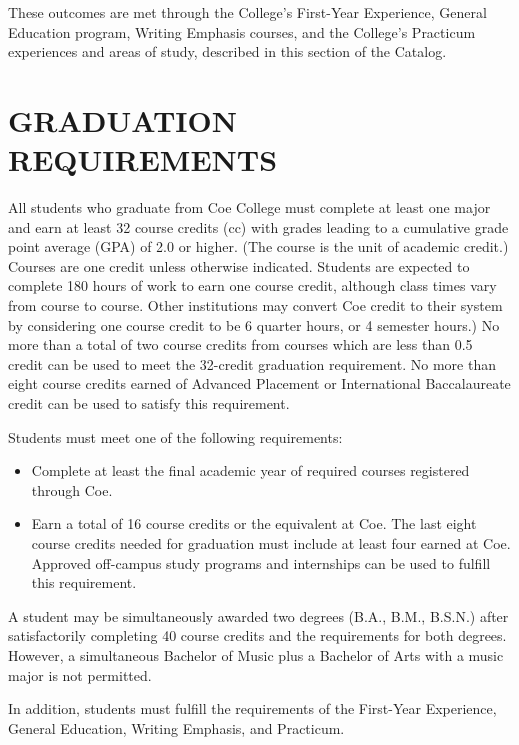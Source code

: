 \documentclass[
  letterpaper,
]{scrbook}
\providecommand{\tightlist}{%
  \setlength{\itemsep}{0pt}\setlength{\parskip}{0pt}}
\begin{document}
These outcomes are met through the College's First-Year Experience,
General Education program, Writing Emphasis courses, and the College's
Practicum experiences and areas of study, described in this section of
the Catalog.

\hypertarget{graduation-requirements}{%
\chapter{GRADUATION REQUIREMENTS}\label{graduation-requirements}}

All students who graduate from Coe College must complete at least one
major and earn at least 32 course credits (cc) with grades leading to a
cumulative grade point average (GPA) of 2.0 or higher. (The course is
the unit of academic credit.) Courses are one credit unless otherwise
indicated. Students are expected to complete 180 hours of work to earn
one course credit, although class times vary from course to course.
Other institutions may convert Coe credit to their system by considering
one course credit to be 6 quarter hours, or 4 semester hours.) No more
than a total of two course credits from courses which are less than 0.5
credit can be used to meet the 32-credit graduation requirement. No more
than eight course credits earned of Advanced Placement or International
Baccalaureate credit can be used to satisfy this requirement.

Students must meet one of the following requirements:

\begin{itemize}
\tightlist
\item
  Complete at least the final academic year of required courses
  registered through Coe.
\item
  Earn a total of 16 course credits or the equivalent at Coe. The last
  eight course credits needed for graduation must include at least four
  earned at Coe. Approved off-campus study programs and internships can
  be used to fulfill this requirement.
\end{itemize}

A student may be simultaneously awarded two degrees (B.A., B.M., B.S.N.)
after satisfactorily completing 40 course credits and the requirements
for both degrees. However, a simultaneous Bachelor of Music plus a
Bachelor of Arts with a music major is not permitted.

In addition, students must fulfill the requirements of the First-Year
Experience, General Education, Writing Emphasis, and Practicum.
\end{document}
